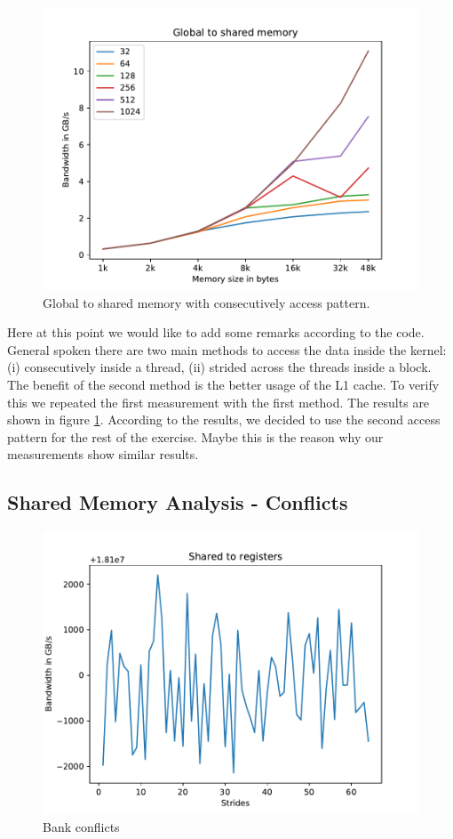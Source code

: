 \documentclass[12pt]{article}
\begin{document}
\begin{figure}[H]
	\centering
	\includegraphics[width=0.7\linewidth]{../../template/plots/aufgabe4_2a_v2}
	\caption{Global to shared memory with consecutively access pattern.}
	\label{fig:aufgabe42av2}
\end{figure}


Here at this point we would like to add some remarks according to the code. General spoken there are two main methods to access the data inside the kernel: (i) consecutively inside a thread, (ii) strided across the threads inside a block. The benefit of the second method is the better usage of the L1 cache. To verify this we repeated the first measurement with the first method. The results are shown in figure \ref{fig:aufgabe42av2}. According to the results, we decided to use the second access pattern for the rest of the exercise. Maybe this is the reason why our measurements show similar results. 

\subsection{Shared Memory Analysis - Conflicts}

\begin{figure}[H]
	\centering
	\includegraphics[width=0.7\linewidth]{../../template/plots/aufgabe4_3}
	\caption{Bank conflicts}
	\label{fig:aufgabe43}
\end{figure}
\end{document}
